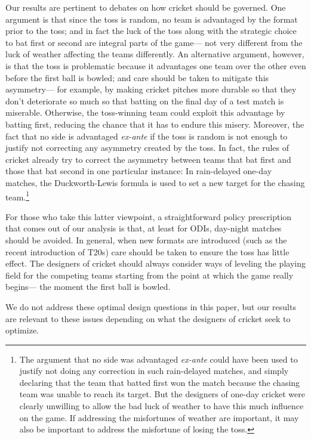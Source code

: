 \documentclass[11pt,  letterpaper]{article}
\begin{document}
Our results are pertinent to debates on how cricket should be governed. One argument is that since the toss is random, no team is advantaged by the format prior to the toss; and in fact the luck of the toss along with the strategic choice to bat first or second are integral parts of the game--- not very different from the luck of weather affecting the teams differently. 
An alternative argument, however, is that the toss is problematic because it advantages one team over the other even before the first ball is bowled; and care should be taken to mitigate this asymmetry--- for example, by making cricket pitches more durable so that they don't deteriorate so much so that batting on the final day of a test match is miserable. Otherwise, the toss-winning team could exploit this advantage by batting first, reducing the chance that it has to endure this misery. Moreover, the fact that no side is advantaged \emph{ex-ante} if the toss is random is not enough to justify not correcting any asymmetry created by the toss. In fact, the rules of cricket already try to correct the asymmetry between teams that bat first and those that bat second in one particular instance: In rain-delayed one-day matches, the Duckworth-Lewis formula is used to set a new target for the chasing team.\footnote{The argument that no side was advantaged \emph{ex-ante} could have been used to justify not doing any correction in such rain-delayed matches, and simply declaring that the team that batted first won the match because the chasing team was unable to reach its target. But the designers of one-day cricket were clearly unwilling to allow the bad luck of weather to have this much influence on the game. If addressing the misfortunes of weather are important, it may also be important to address the misfortune of losing the toss.} 

For those who take this latter viewpoint, a straightforward policy prescription that comes out of our analysis is that, at least for ODIs, day-night matches should be avoided. In general, when new formats are introduced (such as the recent introduction of T20s) care should be taken to ensure the toss has little effect. The designers of cricket should always consider ways of leveling the playing field for the competing teams starting from the point at which the game really begins--- the moment the first ball is bowled. 

We do not address these optimal design questions in this paper, but our results are relevant to these issues depending on what the designers of cricket seek to optimize. %
\end{document}
